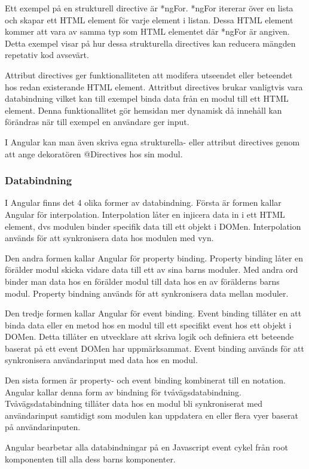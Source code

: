 Ett exempel på en strukturell directive är *ngFor. *ngFor itererar över en lista och skapar ett HTML element för varje element i listan. Dessa HTML element kommer att vara av samma typ som HTML elementet där *ngFor är angiven. Detta exempel visar på hur dessa strukturella directives kan reducera mängden repetativ kod avsevärt.

Attribut directives ger funktionalliteten att modifera utseendet eller beteendet hos redan existerande HTML element. Attritbut directives brukar vanligtvis vara databindning vilket kan till exempel binda data från en modul till ett HTML element. Denna funktionallitet gör hemsidan mer dynamisk då innehåll kan förändras när till exempel en användare ger input.

I Angular kan man även skriva egna strukturella- eller attribut directives genom att ange dekoratören @Directives hos sin modul.

\subsubsection{Databindning}
I Angular finns det 4 olika former av databindning. Första är formen kallar Angular för interpolation. Interpolation låter en  injicera data in i ett HTML element, dvs modulen binder specifik data till ett objekt i DOMen. Interpolation används för att synkronisera data hos modulen med vyn.

Den andra formen kallar Angular för property binding. Property binding låter en förälder modul skicka vidare data till ett av sina barns moduler. Med andra ord binder man data hos en förälder modul till data hos en av förälderns barns modul. Property bindning används för att synkronisera data mellan moduler.

Den tredje formen kallar Angular för event binding. Event binding tillåter en att binda data eller en metod hos en modul till ett specifikt event hos ett objekt i DOMen. Detta tillåter en utvecklare att skriva logik och definiera ett beteende baserat på ett event DOMen har uppmärksammat. Event binding används för att synkronisera användarinput med data hos en modul.

Den sista formen är property- och event binding kombinerat till en notation. Angular kallar denna form av bindning för tvåvägsdatabindning. Tvåvägsdatabindning tillåter data hos en modul bli synkroniserat med användarinput samtidigt som modulen kan uppdatera en eller flera vyer baserat på användarinputen.

Angular bearbetar alla databindningar på en Javascript event cykel från root komponenten till alla dess barns komponenter.

